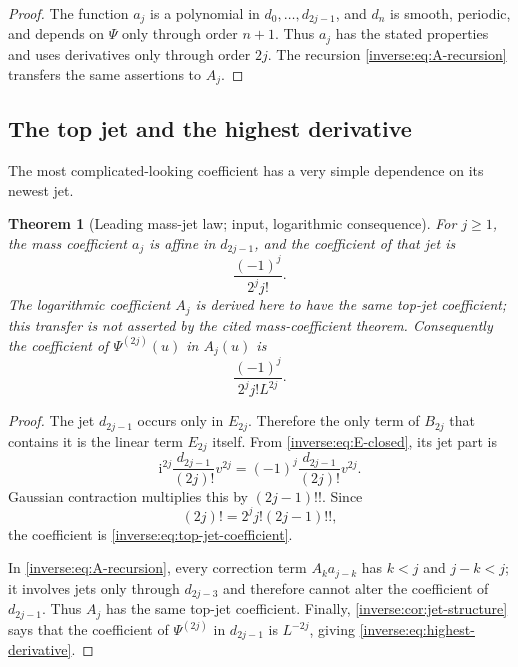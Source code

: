 \documentclass[11pt,oneside]{article}
\newtheorem{theorem}{Theorem}[section]
\theoremstyle{definition}
\theoremstyle{remark}
\newcommand{\ii}{\mathrm i}
\begin{document}
\begin{proof}
The function $a_j$ is a polynomial in
$d_0,\dots,d_{2j-1}$, and $d_n$ is smooth, periodic, and depends on
$\Psi$ only through order $n+1$.  Thus $a_j$ has the stated properties
and uses derivatives only through order $2j$.  The recursion
\eqref{inverse:eq:A-recursion} transfers the same assertions to $A_j$.
\end{proof}

\subsection{The top jet and the highest derivative}

The most complicated-looking coefficient has a very simple dependence on
its newest jet.

\begin{theorem}[Leading mass-jet law; \Formalized input, \Derived logarithmic consequence]
\label{inverse:thm:top-jet}
For $j\geq1$, the mass coefficient $a_j$ is affine in $d_{2j-1}$, and
the coefficient of that jet is
\begin{equation}
 \frac{(-1)^j}{2^j j!}. \label{inverse:eq:top-jet-coefficient}
\end{equation}
The logarithmic coefficient $A_j$ is derived here to have the same top-jet coefficient; this transfer is not asserted by the cited mass-coefficient theorem.
Consequently the coefficient of $\Psi^{(2j)}(u)$ in $A_j(u)$ is
\begin{equation}
 \boxed{\frac{(-1)^j}{2^j j!L^{2j}}.}
 \label{inverse:eq:highest-derivative}
\end{equation}
\end{theorem}

\begin{proof}
The jet $d_{2j-1}$ occurs only in $E_{2j}$.  Therefore the only term of
$B_{2j}$ that contains it is the linear term $E_{2j}$ itself.  From
\eqref{inverse:eq:E-closed}, its jet part is
\[
 \ii^{2j}\frac{d_{2j-1}}{(2j)!}v^{2j}
 =(-1)^j\frac{d_{2j-1}}{(2j)!}v^{2j}.
\]
Gaussian contraction multiplies this by $(2j-1)!!$.  Since
\[
 (2j)!=2^jj!(2j-1)!!,
\]
the coefficient is \eqref{inverse:eq:top-jet-coefficient}.

In \eqref{inverse:eq:A-recursion}, every correction term
$A_ka_{j-k}$ has $k<j$ and $j-k<j$; it involves jets only through
$d_{2j-3}$ and therefore cannot alter the coefficient of $d_{2j-1}$.
Thus $A_j$ has the same top-jet coefficient.  Finally,
\cref{inverse:cor:jet-structure} says that the coefficient of
$\Psi^{(2j)}$ in $d_{2j-1}$ is $L^{-2j}$, giving
\eqref{inverse:eq:highest-derivative}.
\end{proof}
\end{document}
